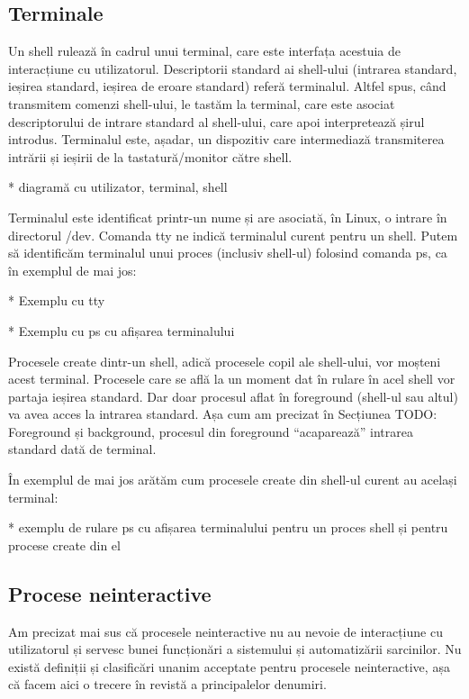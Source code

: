 \subsection{Terminale}

Un shell rulează în cadrul unui terminal, care este interfața acestuia de
interacțiune cu utilizatorul. Descriptorii standard ai shell-ului (intrarea
standard, ieșirea standard, ieșirea de eroare standard) referă terminalul.
Altfel spus, când transmitem comenzi shell-ului, le tastăm la terminal, care
este asociat descriptorului de intrare standard al shell-ului, care apoi
interpretează șirul introdus. Terminalul este, așadar, un dispozitiv care
intermediază transmiterea intrării și ieșirii de la tastatură/monitor către
shell.

* diagramă cu utilizator, terminal, shell

Terminalul este identificat printr-un nume și are asociată, în Linux, o intrare
în directorul /dev. Comanda tty ne indică terminalul curent pentru un shell.
Putem să identificăm terminalul unui proces (inclusiv shell-ul) folosind comanda
ps, ca în exemplul de mai jos:

* Exemplu cu tty

* Exemplu cu ps cu afișarea terminalului

Procesele create dintr-un shell, adică procesele copil ale shell-ului, vor
moșteni acest terminal. Procesele care se află la un moment dat în rulare în
acel shell vor partaja ieșirea standard. Dar doar procesul aflat în foreground
(shell-ul sau altul) va avea acces la intrarea standard. Așa cum am precizat în
Secțiunea TODO: Foreground și background, procesul din foreground “acaparează”
intrarea standard dată de terminal.

În exemplul de mai jos arătăm cum procesele create din shell-ul curent au
același terminal:

* exemplu de rulare ps cu afișarea terminalului pentru un proces shell și pentru
procese create din el

\subsection{Procese neinteractive}

Am precizat mai sus că procesele neinteractive nu au nevoie de interacțiune cu
utilizatorul și servesc bunei funcționări a sistemului și automatizării
sarcinilor. Nu există definiții și clasificări unanim acceptate pentru procesele
neinteractive, așa că facem aici o trecere în revistă a principalelor denumiri.

